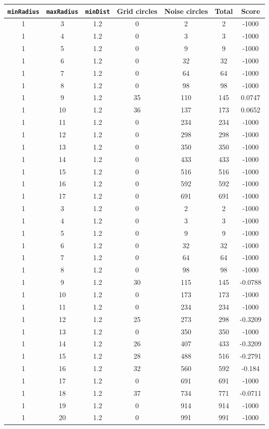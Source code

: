 \documentclass[letterpaper, 12pt]{article}
\begin{document}
\begin{longtable}{|c|c|c|c|c|c|c|}
\hline
\textbf{\texttt{minRadius}} & \textbf{\texttt{maxRadius}} & \textbf{\texttt{minDist}} & \textbf{Grid circles} & \textbf{Noise circles} & \textbf{Total} & \textbf{Score} \\
\hline
1 & 3 & 1.2 & 0 & 2 & 2 & -1000 \\
\hline
1 & 4 & 1.2 & 0 & 3 & 3 & -1000 \\
\hline
1 & 5 & 1.2 & 0 & 9 & 9 & -1000 \\
\hline
1 & 6 & 1.2 & 0 & 32 & 32 & -1000 \\
\hline
1 & 7 & 1.2 & 0 & 64 & 64 & -1000 \\
\hline
1 & 8 & 1.2 & 0 & 98 & 98 & -1000 \\
\hline
1 & 9 & 1.2 & 35 & 110 & 145 & 0.0747 \\
\hline
1 & 10 & 1.2 & 36 & 137 & 173 & 0.0652 \\
\hline
1 & 11 & 1.2 & 0 & 234 & 234 & -1000 \\
\hline
1 & 12 & 1.2 & 0 & 298 & 298 & -1000 \\
\hline
1 & 13 & 1.2 & 0 & 350 & 350 & -1000 \\
\hline
1 & 14 & 1.2 & 0 & 433 & 433 & -1000 \\
\hline
1 & 15 & 1.2 & 0 & 516 & 516 & -1000 \\
\hline
1 & 16 & 1.2 & 0 & 592 & 592 & -1000 \\
\hline
1 & 17 & 1.2 & 0 & 691 & 691 & -1000 \\
\hline
1 & 3 & 1.2 & 0 & 2 & 2 & -1000 \\
\hline
1 & 4 & 1.2 & 0 & 3 & 3 & -1000 \\
\hline
1 & 5 & 1.2 & 0 & 9 & 9 & -1000 \\
\hline
1 & 6 & 1.2 & 0 & 32 & 32 & -1000 \\
\hline
1 & 7 & 1.2 & 0 & 64 & 64 & -1000 \\
\hline
1 & 8 & 1.2 & 0 & 98 & 98 & -1000 \\
\hline
1 & 9 & 1.2 & 30 & 115 & 145 & -0.0788 \\
\hline
1 & 10 & 1.2 & 0 & 173 & 173 & -1000 \\
\hline
1 & 11 & 1.2 & 0 & 234 & 234 & -1000 \\
\hline
1 & 12 & 1.2 & 25 & 273 & 298 & -0.3209 \\
\hline
1 & 13 & 1.2 & 0 & 350 & 350 & -1000 \\
\hline
1 & 14 & 1.2 & 26 & 407 & 433 & -0.3209 \\
\hline
1 & 15 & 1.2 & 28 & 488 & 516 & -0.2791 \\
\hline
1 & 16 & 1.2 & 32 & 560 & 592 & -0.184 \\
\hline
1 & 17 & 1.2 & 0 & 691 & 691 & -1000 \\
\hline
1 & 18 & 1.2 & 37 & 734 & 771 & -0.0711 \\
\hline
1 & 19 & 1.2 & 0 & 914 & 914 & -1000 \\
\hline
1 & 20 & 1.2 & 0 & 991 & 991 & -1000 \\
\hline
\end{longtable}
\end{document}
